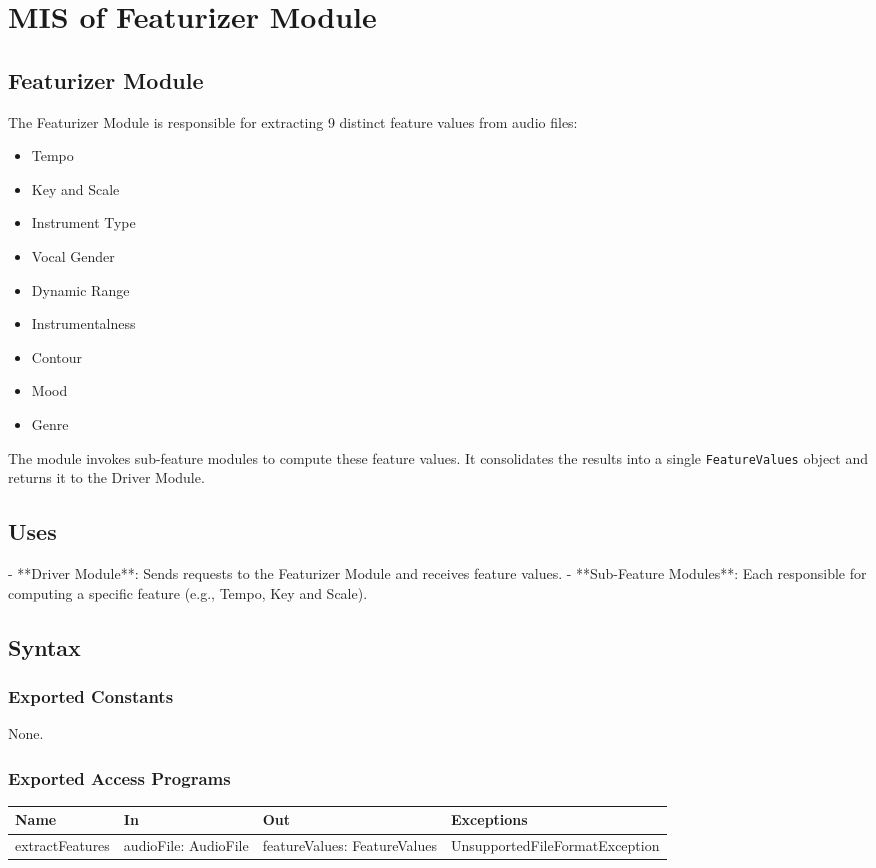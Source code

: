 \documentclass[12pt, titlepage]{article}
\begin{document}
\section{MIS of Featurizer Module}

\subsection{Featurizer Module}
The Featurizer Module is responsible for extracting 9 distinct feature values from audio files:
\begin{itemize}
    \item Tempo
    \item Key and Scale
    \item Instrument Type
    \item Vocal Gender
    \item Dynamic Range
    \item Instrumentalness
    \item Contour
    \item Mood
    \item Genre
\end{itemize}

The module invokes sub-feature modules to compute these feature values. It consolidates the results into a single \texttt{FeatureValues} object and returns it to the Driver Module.

\subsection{Uses}
- **Driver Module**: Sends requests to the Featurizer Module and receives feature values.
- **Sub-Feature Modules**: Each responsible for computing a specific feature (e.g., Tempo, Key and Scale).

\subsection{Syntax}

\subsubsection{Exported Constants}
None.

\subsubsection{Exported Access Programs}

\begin{center}
\begin{tabular}{p{2cm} p{4cm} p{4cm} p{2cm}}
\hline
\textbf{Name} & \textbf{In} & \textbf{Out} & \textbf{Exceptions}\\
\hline
extractFeatures & audioFile: AudioFile & featureValues: FeatureValues & UnsupportedFileFormatException \\
\hline
\end{tabular}
\end{center}
\end{document}
